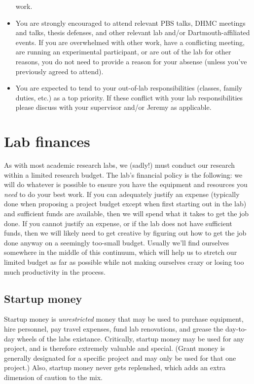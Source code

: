\documentclass{tufte-book} %
\begin{document}
\begin{itemize}
  work.
\item You are strongly encouraged to attend relevant PBS talks, DHMC
  meetings and talks, thesis defenses, and other relevant lab and/or
  Dartmouth-affiliated events.  If you are overwhelmed with other
  work, have a conflicting meeting, are running an experimental
  participant, or are out of the lab for other reasons, you do not
  need to provide a reason for your absense (unless you've previously agreed to
  attend).
\item You are expected to tend to your out-of-lab responsibilities
  (classes, family duties, etc.) as a top priority.  If these conflict
  with your lab responsibilities please discuss with your supervisor
  and/or Jeremy as applicable.
\end{itemize}


 \section{Lab finances}
 As with most academic research labs, we (sadly!) must conduct our
 research within a limited research budget.  The lab's financial
 policy is the following: we will do whatever is possible to ensure
 you have the equipment and resources you \textit{need} to do your best work.
 If you can adequately justify an expense (typically done when proposing a
 project budget except when first starting out in the lab) and sufficient funds
 are available, then we will spend what it takes to get the job done.
 If you cannot justify an expense, or if the lab does not have
 sufficient funds, then we will likely need to get creative by
 figuring out how to get the job done anyway on a seemingly too-small
 budget.  Usually we'll find ourselves somewhere in the middle of this
 continuum, which will help us to stretch our limited budget as far as
 possible while not making ourselves crazy or losing too much
 productivity in the process.

\subsection{Startup money}
Startup money is \textit{unrestricted} money that may be used to
purchase equipment, hire personnel, pay travel expenses, fund lab
renovations, and grease the day-to-day wheels of the labs existance.
Critically, startup money may be used for any project, and is
therefore extremely valuable and special.  (Grant money is generally
designated for a specific project and may only be used for that one
project.)  Also, startup money never gets replenshed, which adds an
extra dimension of caution to the mix.
\end{document}

